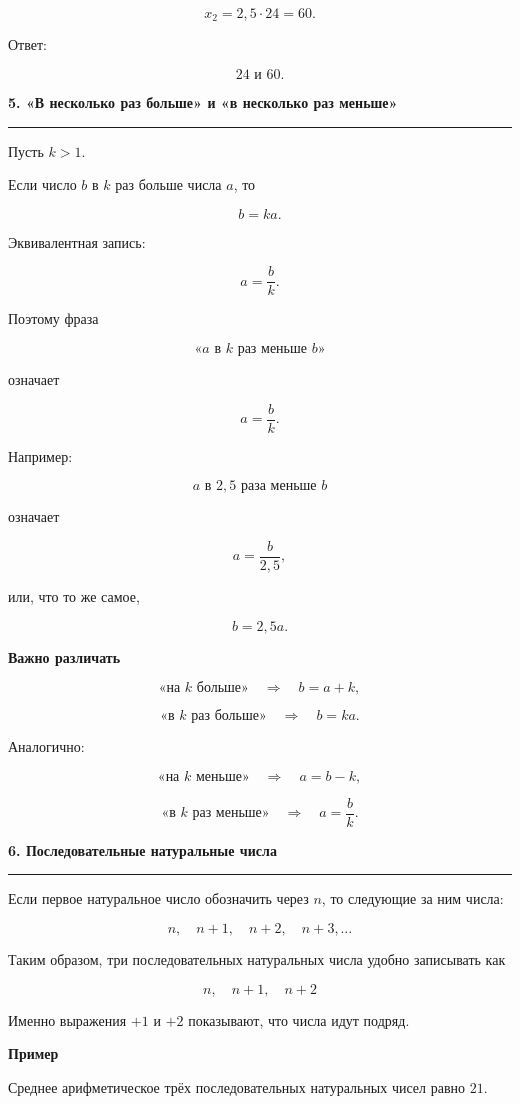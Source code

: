 \documentclass[a4paper,12pt]{article}
\newcommand{\topicsection}[1]{%
    \vspace{0.7em}
    {\Large\bfseries\color{darkaccent}#1}\par
    \vspace{0.15em}
    {\color{accent}\rule{\linewidth}{0.7pt}}
    \vspace{0.35em}
}
\newcommand{\subtopic}[1]{%
    \vspace{0.4em}
    {\large\bfseries\color{darkaccent}#1}\par
}
\begin{document}
\[
x_2=2{,}5\cdot24=60.
\]

Ответ:

\[
\boxed{24 \text{ и } 60}.
\]

\topicsection{5. «В несколько раз больше» и «в несколько раз меньше»}

Пусть \(k>1\).

Если число \(b\) в \(k\) раз больше числа \(a\), то

\[
\boxed{b=ka}.
\]

Эквивалентная запись:

\[
\boxed{a=\frac{b}{k}}.
\]

Поэтому фраза

\[
\text{«}a\text{ в }k\text{ раз меньше }b\text{»}
\]

означает

\[
\boxed{a=\frac{b}{k}}.
\]

Например:

\[
a \text{ в }2{,}5\text{ раза меньше }b
\]

означает

\[
a=\frac{b}{2{,}5},
\]

или, что то же самое,

\[
b=2{,}5a.
\]

\subtopic{Важно различать}

\[
\text{«на }k\text{ больше»}
\quad\Longrightarrow\quad
b=a+k,
\]

\[
\text{«в }k\text{ раз больше»}
\quad\Longrightarrow\quad
b=ka.
\]

Аналогично:

\[
\text{«на }k\text{ меньше»}
\quad\Longrightarrow\quad
a=b-k,
\]

\[
\text{«в }k\text{ раз меньше»}
\quad\Longrightarrow\quad
a=\frac{b}{k}.
\]

\topicsection{6. Последовательные натуральные числа}

Если первое натуральное число обозначить через \(n\), то следующие за ним числа:

\[
\boxed{
n,\quad n+1,\quad n+2,\quad n+3,\dots
}
\]

Таким образом, три последовательных натуральных числа удобно записывать как

\[
\boxed{
n,\quad n+1,\quad n+2
}
\]

Именно выражения \(+1\) и \(+2\) показывают, что числа идут подряд.

\subtopic{Пример}

Среднее арифметическое трёх последовательных натуральных чисел равно \(21\).
\end{document}
